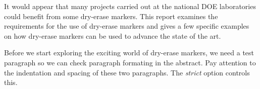     It would appear that many projects carried out at the national
    DOE laboratories could benefit from some dry-erase markers. This
    report examines the requirements for the use of dry-erase markers
    and gives a few specific examples on how dry-erase markers can
    be used to advance the state of the art.

    Before we start exploring the exciting world of dry-erase
    markers, we need a test paragraph so we can check paragraph
    formating in the abstract.  Pay attention to the indentation
    and spacing of these two paragraphs. The \emph{strict} option
    controls this.
